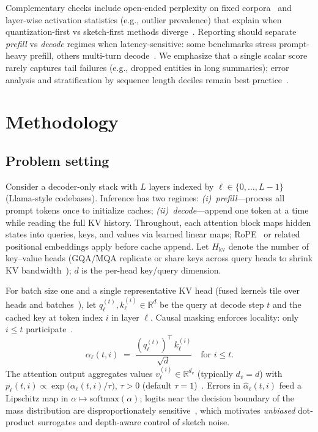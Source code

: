 \documentclass[conference]{IEEEtran}
\begin{document}
Complementary checks include open-ended perplexity on fixed corpora~\cite{touvron2023llama} and layer-wise activation statistics (e.g., outlier prevalence) that explain when quantization-first vs sketch-first methods diverge~\cite{kvquant2023,kivi2024}. Reporting should separate \emph{prefill} vs \emph{decode} regimes when latency-sensitive: some benchmarks stress prompt-heavy prefill, others multi-turn decode~\cite{bai2023longbench,presentation_mqjl}. We emphasize that a single scalar score rarely captures tail failures (e.g., dropped entities in long summaries); error analysis and stratification by sequence length deciles remain best practice~\cite{bai2023longbench}.

\section{Methodology}
\label{sec:method}

\subsection{Problem setting}
\label{sec:problem}

Consider a decoder-only stack with $L$ layers indexed by \(\ell\in\{0,\ldots,L-1\}\) (Llama-style codebases). Inference has two regimes: \emph{(i)~prefill}---process all prompt tokens once to initialize caches; \emph{(ii)~decode}---append one token at a time while reading the full KV history. Throughout, each attention block maps hidden states into queries, keys, and values via learned linear maps; RoPE~\cite{touvron2023llama} or related positional embeddings apply before cache append. Let \(H_{\mathrm{kv}}\) denote the number of key--value heads (GQA/MQA replicate or share keys across query heads to shrink KV bandwidth~\cite{shazeer2019mqa}); \(d\) is the per-head key/query dimension.

For batch size one and a single representative KV head (fused kernels tile over heads and batches~\cite{zandieh2024qjl,qjlkernel}), let \(q_\ell^{(t)}, k_\ell^{(i)}\in\mathbb{R}^d\) be the query at decode step \(t\) and the cached key at token index \(i\) in layer \(\ell\). Causal masking enforces locality: only \(i\le t\) participate~\cite{zandieh2024qjl}.
\begin{equation}
\alpha_{\ell}(t,i) \;=\; \frac{(q_\ell^{(t)})^\top\, k_\ell^{(i)}}{\sqrt{d}} \quad\text{for } i\le t .
\end{equation}
The attention output aggregates values $v_\ell^{(i)}\in\mathbb{R}^{d_v}$ (typically \(d_v{=}d\)) with $p_{\ell}(t,i)\propto \exp \big(\alpha_{\ell}(t,i)/\tau\big)$, \(\tau{>}0\) (default \(\tau{=}1\))~\cite{zandieh2024qjl}. Errors in \(\hat{\alpha}_{\ell}(t,i)\) feed a Lipschitz map in \(\alpha\mapsto \mathrm{softmax}(\alpha)\); logits near the decision boundary of the mass distribution are disproportionately sensitive~\cite{vitspec2021}, which motivates \emph{unbiased} dot-product surrogates and depth-aware control of sketch noise.
\end{document}
